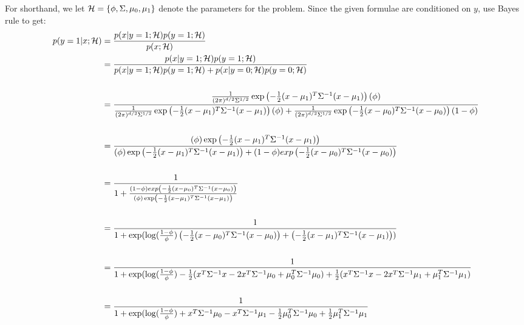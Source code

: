 \begin{answer}
  For shorthand, we let $\mathcal{H} = \{\phi, \Sigma, \mu_{0}, \mu_1\}$ denote
  the parameters for the problem.
  Since the given formulae are conditioned on $y$, use Bayes rule to get:
  \begin{align*}
    p(y =1\vert  x ; \mc{H}) &= \frac {p(x\vert y=1; \mc{H}) p(y=1; \mc{H})} {p(x; \mc{H})}\\
    & = \frac {p(x\vert y=1; \mc{H}) p(y=1; \mc{H})}
      {p(x\vert y=1; \mc{H}) p(y=1; \mc{H}) + p(x\vert y={0}; \mc{H}) p(y={0};
      \mc{H})}\\
    &\\
    &= \frac { \frac{1}{(2\pi)^{\di/2} \Sigma^{1/2}}\exp\left(-\frac{1}{2} (x-\mu_1)^T \Sigma^{-1} (x-\mu_1) \right) (\phi) }
      {\frac{1}{(2\pi)^{\di/2} \Sigma^{1/2}}\exp\left(-\frac{1}{2} (x-\mu_1)^T \Sigma^{-1} (x-\mu_1) \right) (\phi)  + \frac{1}{(2\pi)^{\di/2} \Sigma^{1/2}}\exp\left(-\frac{1}{2} (x-\mu_0)^T \Sigma^{-1} (x-\mu_0) \right) (1- \phi) }\\
    &\\ 
    &= \frac { (\phi) \exp\left(-\frac{1}{2} (x-\mu_1)^T \Sigma^{-1} (x-\mu_1) \right)  }
      { (\phi) \exp\left(-\frac{1}{2} (x-\mu_1)^T \Sigma^{-1} (x-\mu_1) \right) + (1- \phi)exp\left(-\frac{1}{2} (x-\mu_0)^T \Sigma^{-1} (x-\mu_0) \right)  }\\
    &\\ 
    &= \frac { 1 }
      { 1 + \frac{(1- \phi)exp\left(-\frac{1}{2} (x-\mu_0)^T \Sigma^{-1} (x-\mu_0) \right)}{(\phi) \exp\left(-\frac{1}{2} (x-\mu_1)^T \Sigma^{-1} (x-\mu_1) \right) } }\\
    &\\ 
    &= \frac { 1 }
      { 1 + \exp( \log(\frac{1-\phi}{\phi}) \left(-\frac{1}{2} (x-\mu_0)^T \Sigma^{-1} (x-\mu_0) \right) + \left(-\frac{1}{2} (x-\mu_1)^T \Sigma^{-1} (x-\mu_1) \right)  )}\\
    &\\
    &= \frac { 1 }
      { 1 + \exp( \log(\frac{1-\phi}{\phi}) -\frac{1}{2} (x^T \Sigma^{-1} x -2 x^T\Sigma^{-1}\mu_0+ \mu_0^T \Sigma^{-1} \mu_0) + \frac{1}{2} (x^T \Sigma^{-1} x -2 x^T\Sigma^{-1}\mu_1+ \mu_1^T \Sigma^{-1} \mu_1       )}\\
    &\\ 
&= \frac { 1 }
      { 1 + \exp( \log(\frac{1-\phi}{\phi}) + x^T \Sigma^{-1} \mu_0 - x^T \Sigma^{-1} \mu_1 -\frac{1}{2} \mu_0^T \Sigma^{-1} \mu_0  + \frac{1}{2} \mu_1^T \Sigma^{-1} \mu_1}\\

\end{align*}
\end{answer}
